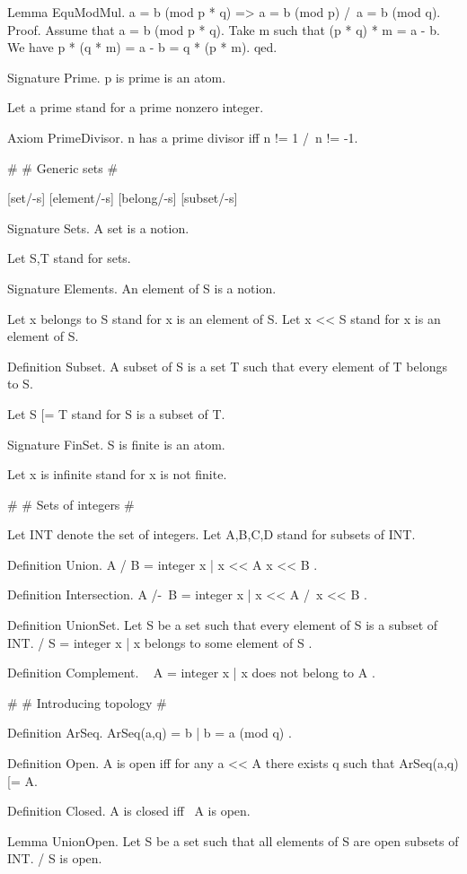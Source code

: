 Lemma EquModMul. a = b (mod p * q) => a = b (mod p) /\ a = b (mod q).
Proof.
    Assume that a = b (mod p * q).
    Take m such that (p * q) * m = a - b.
    We have p * (q * m) = a - b = q * (p * m).
qed.

Signature Prime.    p is prime is an atom.

Let a prime stand for a prime nonzero integer.

Axiom PrimeDivisor. n has a prime divisor iff n != 1 /\ n != -1.


#
# Generic sets
#

[set/-s] [element/-s] [belong/-s] [subset/-s]

Signature Sets.     A set is a notion.

Let S,T stand for sets.

Signature Elements. An element of S is a notion.

Let x belongs to S stand for x is an element of S.
Let x << S stand for x is an element of S.

Definition Subset.  A subset of S is a set T such that
                        every element of T belongs to S.

Let S [= T stand for S is a subset of T.

Signature FinSet.   S is finite is an atom.

Let x is infinite stand for x is not finite.


#
# Sets of integers
#

Let INT denote the set of integers.
Let A,B,C,D stand for subsets of INT.

Definition Union.
    A \-/ B = { integer x | x << A \/ x << B }.

Definition Intersection.
    A /-\ B = { integer x | x << A /\ x << B }.

Definition UnionSet.
    Let S be a set such that every element of S is a subset of INT.
    \-/ S = { integer x | x belongs to some element of S }.

Definition Complement.
    ~ A = { integer x | x does not belong to A }.


#
# Introducing topology
#

Definition ArSeq.   ArSeq(a,q) = { b | b = a (mod q) }.

Definition Open.    A is open iff for any a << A
                        there exists q such that ArSeq(a,q) [= A.

Definition Closed.  A is closed iff ~A is open.

Lemma UnionOpen.    Let S be a set such that
                        all elements of S are open subsets of INT.
                    \-/ S is open.

